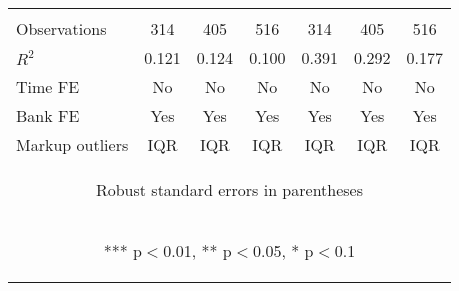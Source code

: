\begin{tabular}{lcccccc}
\vspace{4pt} & \begin{footnotesize}\end{footnotesize} & \begin{footnotesize}\end{footnotesize} & \begin{footnotesize}\end{footnotesize} & \begin{footnotesize}\end{footnotesize} & \begin{footnotesize}\end{footnotesize} & \begin{footnotesize}\end{footnotesize} \\
Observations & 314 & 405 & 516 & 314 & 405 & 516 \\
$R^2$ & 0.121 & 0.124 & 0.100 & 0.391 & 0.292 & 0.177 \\
Time FE & No & No & No & No & No & No \\
Bank FE & Yes & Yes & Yes & Yes & Yes & Yes \\
 Markup outliers & IQR & IQR & IQR & IQR & IQR & IQR \\ \hline
\multicolumn{7}{c}{\begin{footnotesize} Robust standard errors in parentheses\end{footnotesize}} \\
\multicolumn{7}{c}{\begin{footnotesize} *** p$<$0.01, ** p$<$0.05, * p$<$0.1\end{footnotesize}} \\
\end{tabular}


